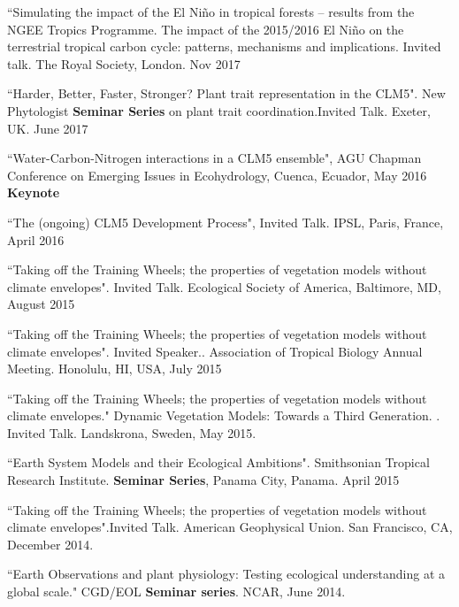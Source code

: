 \documentclass[10pt]{article}
\newenvironment{lonelist}[1][\enskip\textbullet]%
        {\vspace{-\baselineskip}\begin{list}{#1}{%
        \setlength{\itemindent}{-3pt} 
        \setlength{\partopsep}{0pt}%
        \setlength{\leftmargin}{10pt}
        \setlength{\topsep}{15pt}}}
        {\end{list}\vspace{-.3\baselineskip}}
\begin{document}
\begin{lonelist}
\begin{lonelist}
\item{``Simulating the impact of the El Niño in tropical forests – results from the NGEE Tropics Programme.   The impact of the 2015/2016 El Niño on the terrestrial tropical carbon cycle: patterns, mechanisms and implications. Invited talk. The Royal Society, London. Nov 2017}

\item{``Harder, Better, Faster, Stronger? Plant trait representation in the CLM5". New Phytologist \textbf{Seminar Series} on plant trait coordination.Invited Talk. Exeter, UK. June 2017}

\item{``Water-Carbon-Nitrogen interactions in a CLM5 ensemble", AGU Chapman Conference on Emerging Issues in Ecohydrology, Cuenca, Ecuador, May 2016 \textbf{Keynote}}

 \item{``The (ongoing) CLM5 Development Process", Invited Talk. IPSL, Paris, France, April 2016}
 
\item{``Taking off the Training Wheels; the properties of vegetation models without climate envelopes". Invited Talk. Ecological Society of America, Baltimore, MD, August 2015} 

\item{``Taking off the Training Wheels; the properties of vegetation models without climate envelopes". Invited Speaker.. Association of Tropical Biology Annual Meeting. Honolulu, HI, USA, July 2015}

\item ``Taking off the Training Wheels; the properties of vegetation models without climate envelopes." Dynamic Vegetation Models: Towards a Third Generation. . Invited Talk. Landskrona, Sweden, May 2015. 

\item ``Earth System Models and their Ecological Ambitions". Smithsonian Tropical Research Institute. \textbf{Seminar Series}, Panama City, Panama. April 2015

\item ``Taking off the Training Wheels; the properties of vegetation models without climate envelopes".Invited Talk. American Geophysical Union. San Francisco, CA, December 2014. 

\item  ``Earth Observations and plant physiology: Testing ecological understanding at a global scale." CGD/EOL \textbf{Seminar series}. NCAR, June 2014. 


\end{lonelist}
\end{lonelist}
\end{document}
